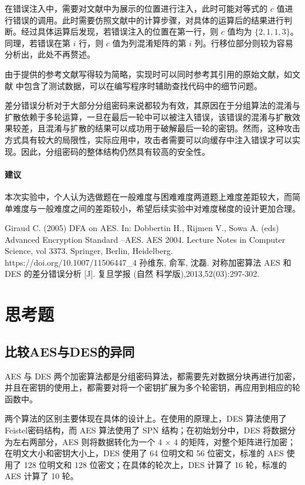 \documentclass[a4paper, zihao=-4, UTF-8]{ctexart}
\newcommand{\upcite}[1]{{\textsuperscript{\cite{#1}}}}
\begin{document}
	在错误注入中，需要对文献中为展示的位置进行注入，此时可能对等式的 $c$ 值进行错误的调用。此时需要仿照文献中的计算步骤，对具体的运算后的结果进行判断。经过具体运算后发现，若错误注入的位置在第一行，则 $c$ 值均为 $\{2, 1, 1, 3\}$。同理，若错误在第 $i$ 行，则 $c$ 值为列混淆矩阵的第 $i$ 列。行移位部分则较为容易分析出，此处不再赘述。
	
	由于提供的参考文献写得较为简略，实现时可以同时参考其引用的原始文献，如文献\upcite{1} 中包含了测试数据，可以在编写程序时辅助查找代码中的细节问题。
	
	差分错误分析对于大部分分组密码来说都较为有效，其原因在于分组算法的混淆与扩散依赖于多轮运算，一旦在最后一轮中可以被注入错误，该错误的混淆与扩散效果较差，且混淆与扩散的结果可以成功用于破解最后一轮的密钥。然而，这种攻击方式具有较大的局限性，实际应用中，攻击者需要可以向缓存中注入错误才可以实现。因此，分组密码的整体结构仍然具有较高的安全性。
	
	\paragraph{建议} 本次实验中，个人认为选做题在一般难度与困难难度两道题上难度差距较大，而简单难度与一般难度之间的差距较小，希望后续实验中对难度梯度的设计更加合理。
	\begin{thebibliography}{99}
		Giraud C. (2005) DFA on AES. In: Dobbertin H., Rijmen V., Sowa A. (eds) Advanced		Encryption Standard –AES. AES 2004. Lecture Notes in Computer Science, vol 3373.		Springer, Berlin, Heidelberg. https://doi.org/10.1007/11506447\_4
		孙维东, 俞军, 沈磊. 对称加密算法 AES 和 DES 的差分错误分析 [J]. 复旦学报 (自然		科学版),2013,52(03):297-302.
	\end{thebibliography}
	\newpage
	\appendix
	
	\section{思考题}
	\subsection{比较AES与DES的异同}
	AES 与 DES 两个加密算法都是分组密码算法，都需要先对数据分块再进行加密，并且在密钥的使用上，都需要对将一个密钥扩展为多个轮密钥，再应用到相应的轮函数中。
	
	两个算法的区别主要体现在具体的设计上。在使用的原理上，DES 算法使用了 Feistel密码结构，而 AES 算法使用了 SPN 结构；在初始划分中，DES 将数据分为左右两部分，AES 则将数据转化为一个 4 × 4 的矩阵，对整个矩阵进行加密；在明文大小和密钥大小上，DES 使用了 64 位明文和 56 位密文，标准的 AES 使用了 128 位明文和 128 位密文；在具体的轮次上，DES 计算了 16 轮，标准的 AES 计算了 10 轮。
	
\end{document}
